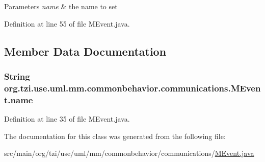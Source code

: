 \begin{DoxyParams}{Parameters}
{\em name} & the name to set \\
\hline
\end{DoxyParams}


Definition at line 55 of file M\-Event.\-java.



\subsection{Member Data Documentation}
\hypertarget{classorg_1_1tzi_1_1use_1_1uml_1_1mm_1_1commonbehavior_1_1communications_1_1_m_event_ab3c4450cd381f85fb880c7b738f660d3}{
\subsubsection[{name}]{\setlength{\rightskip}{0pt plus 5cm}String org.\-tzi.\-use.\-uml.\-mm.\-commonbehavior.\-communications.\-M\-Event.\-name\hspace{0.3cm}{\ttfamily [protected]}}}\label{classorg_1_1tzi_1_1use_1_1uml_1_1mm_1_1commonbehavior_1_1communications_1_1_m_event_ab3c4450cd381f85fb880c7b738f660d3}


Definition at line 35 of file M\-Event.\-java.



The documentation for this class was generated from the following file\-:\begin{DoxyCompactItemize}
\item 
src/main/org/tzi/use/uml/mm/commonbehavior/communications/\hyperlink{_m_event_8java}{M\-Event.\-java}\end{DoxyCompactItemize}
